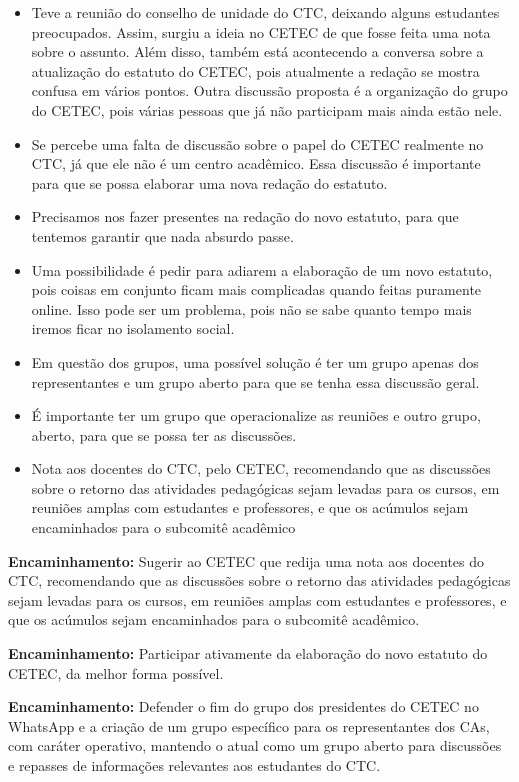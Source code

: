 \documentclass{ata-calico}
\begin{document}
\begin{itemize}
\item Teve a reunião do conselho de unidade do CTC, deixando alguns estudantes preocupados. Assim, surgiu a ideia no CETEC de que fosse feita uma nota sobre o assunto. Além disso, também está acontecendo a conversa sobre a atualização do estatuto do CETEC, pois atualmente a redação se mostra confusa em vários pontos. Outra discussão proposta é a organização do grupo do CETEC, pois várias pessoas que já não participam mais ainda estão nele.
\item Se percebe uma falta de discussão sobre o papel do CETEC realmente no CTC, já que ele não é um centro acadêmico. Essa discussão é importante para que se possa elaborar uma nova redação do estatuto.
\item Precisamos nos fazer presentes na redação do novo estatuto, para que tentemos garantir que nada absurdo passe.
\item Uma possibilidade é pedir para adiarem a elaboração de um novo estatuto, pois coisas em conjunto ficam mais complicadas quando feitas puramente online. Isso pode ser um problema, pois não se sabe quanto tempo mais iremos ficar no isolamento social.
\item Em questão dos grupos, uma possível solução é ter um grupo apenas dos representantes e um grupo aberto para que se tenha essa discussão geral.
\item É importante ter um grupo que operacionalize as reuniões e outro grupo, aberto, para que se possa ter as discussões.
\item Nota aos docentes do CTC, pelo CETEC, recomendando que as discussões sobre o retorno das atividades pedagógicas sejam levadas para os cursos, em reuniões amplas com estudantes e professores, e que os acúmulos sejam encaminhados para o subcomitê acadêmico
\end{itemize}

\textbf{Encaminhamento:} Sugerir ao CETEC que redija uma nota aos docentes do CTC, recomendando que as discussões sobre o retorno das atividades pedagógicas sejam levadas para os cursos, em reuniões amplas com estudantes e professores, e que os acúmulos sejam encaminhados para o subcomitê acadêmico.

\textbf{Encaminhamento:} Participar ativamente da elaboração do novo estatuto do CETEC, da melhor forma possível.

\textbf{Encaminhamento:} Defender o fim do grupo dos presidentes do CETEC no WhatsApp e a criação de um grupo específico para os representantes dos CAs, com caráter operativo, mantendo o atual como um grupo aberto para discussões e repasses de informações relevantes aos estudantes do CTC.
\end{document}
